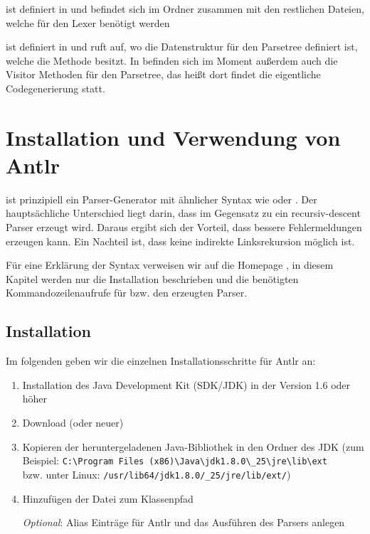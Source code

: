 ist definiert in  und befindet sich im Ordner  zusammen mit den restlichen Dateien, welche für den Lexer benötigt werden

 ist definiert in  und ruft  auf, wo die Datenstruktur für den Parsetree definiert ist, welche die Methode  besitzt. In  befinden sich im Moment außerdem auch die Visitor Methoden für den Parsetree, das heißt dort findet die eigentliche Codegenerierung statt.


\appendix
\newpage




\section{Installation und Verwendung von Antlr} 

 ist prinzipiell ein Parser-Generator mit ähnlicher Syntax wie  oder . Der hauptsächliche Unterschied liegt darin, dass im Gegensatz zu  ein recursiv-descent Parser erzeugt wird. Daraus ergibt sich der Vorteil, dass  bessere Fehlermeldungen erzeugen kann. Ein Nachteil ist, dass keine indirekte Linksrekursion möglich ist.

Für eine Erklärung der Syntax verweisen wir auf die  Homepage \cite{antlrH}, in diesem Kapitel werden nur die Installation beschrieben und die benötigten Kommandozeilenaufrufe für  bzw. den erzeugten Parser.

\subsection{Installation} \label{antlr:I}

Im folgenden geben wir die einzelnen Installationsschritte für Antlr an:

\begin{enumerate}

\item Installation des Java Development Kit (SDK/JDK) in der Version 1.6 oder höher

\item Download  (oder neuer) \cite{antlrD}



\item Kopieren der heruntergeladenen Java-Bibliothek in den  Ordner des JDK (zum Beispiel: \verb|C:\Program Files (x86)\Java\jdk1.8.0\_25\jre\lib\ext| \\ bzw. unter Linux: \verb|/usr/lib64/jdk1.8.0/_25/jre/lib/ext/|)


\item Hinzufügen der  Datei zum Klassenpfad 

\emph{Optional}: Alias Einträge für Antlr und das Ausführen des Parsers anlegen

\end{enumerate}

